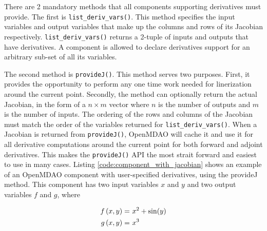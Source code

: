 \documentclass[]{aiaa-tc} %
\begin{document}
        There are 2 mandatory methods that all components supporting derivatives must provide.
        The first is \texttt{list\_deriv\_vars()}. This method specifies the
        input variables and output variables that make up the columns and rows of its Jacobian respectively.
        \texttt{list\_deriv\_vars()} returns a 2-tuple of inputs and outputs that have derivatives.
        A component is allowed to declare derivatives support for an arbitrary sub-set of all its variables.

        The second method is \texttt{provideJ()}. This method serves two purposes. First, it provides the
        opportunity to perform any one time work needed for linerization around the current point. Secondly,
        the method can optionally return the actual Jacobian, in the form of a $n \times m$ vector where $n$ is the
        number of outputs and $m$ is the number of inputs. The ordering of the rows and columns of the Jacobian
        must match the order of the variables returned for \texttt{list\_deriv\_vars()}. When a Jacobian is
        returned from \texttt{provideJ()}, OpenMDAO will cache it and use it for all derivative computations
        around the current point for both forward and adjoint derivatives. This makes the \texttt{provideJ()}
        API the most strait forward and easiest to use in many cases. Listing \ref{code:component_with_jacobian} shows
        an example of an OpenMDAO component with user-specified derivatives, using the provideJ method.
        This component has two input variables $x$ and $y$ and two output variables $f$ and $g$, where

        \begin{align}
            f\left(x, y\right) =&\  x^2 + \sin(y) \\ \notag
            g\left(x, y\right) =&\  x^3
        \end{align}
\end{document}
